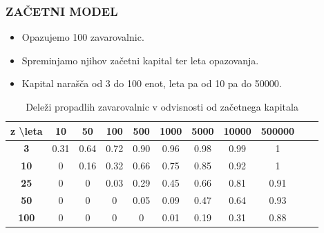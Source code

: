 \documentclass{beamer}
\begin{document}
\begin{frame}
	\frametitle{ZAČETNI MODEL}
	\begin{itemize}
		\item Opazujemo 100 zavarovalnic.
		\item Spreminjamo njihov začetni kapital ter leta opazovanja.
		\item Kapital narašča od 3 do 100 enot, leta pa od 10 pa do 50000.
	\end{itemize}

\begin{table}[htb]
	\centering
	\caption{Deleži propadlih zavarovalnic v odvisnosti od začetnega kapitala}
	\begin{tabular}{|c|c|c|c|c|c|c|c|c|c|c|}
		\hline
		\textbf{z} \backslash \textbf{leta} & \textbf{10} & \textbf{50} & \textbf{100} & \textbf{500} & \textbf{1000} & \textbf{5000} & \textbf{10000} & \textbf{500000} \\\hline
		\textbf{3} & 0.31 & 0.64 & 0.72 & 0.90 & 0.96 & 0.98 & 0.99 & 1 \\\hline
		\textbf{10} & 0 & 0.16 & 0.32  & 0.66 & 0.75 & 0.85 & 0.92 & 1 \\\hline
		\textbf{25} & 0  & 0 & 0.03 & 0.29 & 0.45 & 0.66 & 0.81 & 0.91 \\\hline
		\textbf{50} & 0 & 0 & 0 & 0.05 & 0.09 & 0.47 & 0.64 & 0.93 \\\hline
		\textbf{100} & 0 & 0 & 0 & 0 & 0.01 & 0.19 & 0.31 & 0.88 \\\hline
	\end{tabular}
	\label{tab:my_label}
\end{table}
\end{frame}
\end{document}
